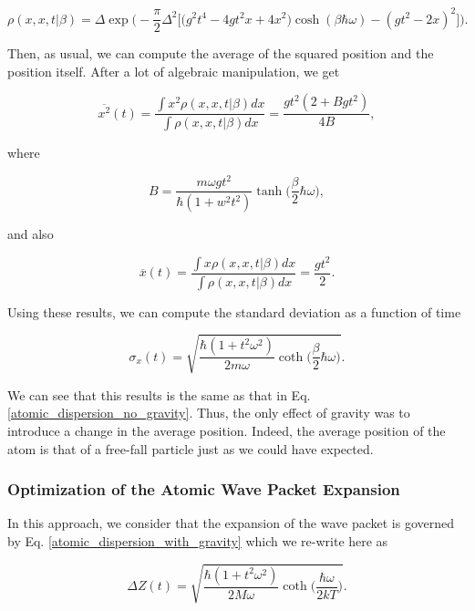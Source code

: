 \documentclass{article}
\begin{document}
\begin{equation}
    \rho(x,x,t|\beta) = \Delta \exp \bigg( -\frac{\pi}{2} \Delta^{2} \Big[ \big( g^{2} t^{4} - 4g t^{2}x + 4x^{2} \big)\cosh(\beta \hbar \omega) - (g t^{2} - 2x)^{2} \Big] \bigg).
\end{equation}

Then, as usual, we can compute the average of the squared position and the position itself. After a lot of algebraic manipulation, we get

\begin{equation}
    \overline{x^{2}} (t)= \frac{\int x^{2} \rho(x,x,t|\beta) dx}{\int \rho(x,x,t|\beta) dx} =  \frac{g t^{2} (2+B g t^{2})}{4B},
\end{equation}

where 

\begin{equation}
    B = \frac{m \omega g t^{2}}{\hbar (1+w^{2}t^{2})} \tanh \bigg(\frac{\beta}{2} \hbar \omega\bigg),
\end{equation}

and also

\begin{equation}
    \overline{x} (t)= \frac{\int x \rho(x,x,t|\beta) dx}{\int \rho(x,x,t|\beta) dx} =  \frac{g t^{2}}{2}.
\end{equation}

Using these results, we can compute the standard deviation as a function of time

\begin{equation}\label{atomic_dispersion_with_gravity}
    \sigma_{x} (t) = \sqrt{\frac{\hbar (1+t^{2} \omega^{2})}{2 m \omega} \coth \bigg(\frac{\beta}{2} \hbar \omega \bigg)}.
\end{equation}

We can see that this results is the same as that in Eq. \ref{atomic_dispersion_no_gravity}. Thus, the only effect of gravity was to introduce a change in the average position. Indeed, the average position of the atom is that of a free-fall particle just as we could have expected.

\subsubsection{Optimization of the Atomic Wave Packet Expansion}
In this approach, we consider that the expansion of the wave packet is governed by Eq. \ref{atomic_dispersion_with_gravity} which we re-write here as

\begin{equation}\label{atomic_dispersion_with_gravity_2}
    \Delta Z (t) = \sqrt{\frac{\hbar (1+t^{2} \omega^{2})}{2 M \omega} \coth \bigg(\frac{\hbar \omega}{2 kT} \bigg)}.
\end{equation}
\end{document}
